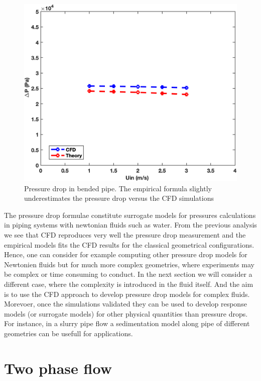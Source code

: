 \documentclass[11pt]{report}
\begin{document}
%
\begin{figure}[ht!]
 \begin{center}
 \includegraphics[scale = 0.45]{figs/bend1}
 \caption{ Pressure drop in bended pipe. The empirical formula slightly underestimates the pressure drop versus the CFD simulations }
 \label{bend:theo}
 \end{center}
 \end{figure}
The pressure drop formulae constitute surrogate models for pressures calculations in piping systems with newtonian fluids such as water. 
%
From the previous analysis we see that CFD reproduces very well the pressure drop measurement and the empirical models fits the CFD results for the classical geometrical configurations. 
%
Hence, one can consider for example computing other pressure drop models for Newtonien fluids but for much more complex geometries, where experiments may be complex or time consuming to conduct. 
%
In the next section we will consider a different case, where the complexity is introduced in the fluid itself. And the aim is to use the CFD approach to develop pressure drop models for complex fluids.
%
Morevoer, once the simulations validated they can be used to develop response models (or surrogate models) for other physical quantities than pressure drops. 
%
For instance, in a slurry pipe flow a sedimentation model along pipe of different geometries can be usefull for applications.  

\section{Two phase flow} \label{Two Phase}
\end{document}
